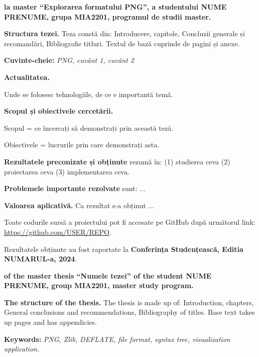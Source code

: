 \documentclass[a4paper,12pt]{report}
\newcommand{\thesisTitleEng}{Numele tezei}
\newcommand{\uniGroupName}{MIA2201}
\newcommand{\authorName}{NUME PRENUME} %
\newcommand{\thesisTitle}{Explorarea formatului PNG}
\newcommand{\thesisType}{master} %
\newcommand{\programulDeStudii}{master} %
\renewcommand{\year}{2024}
\newcommand{\conferencesList}{Conferința Studențească, Editia NUMARUL-a, \year}
\newcommand{\github}{\url{https://github.com/USER/REPO}}
\begin{document}
\titlePage

\clearpage
\tableofcontents

\clearpage
{}

\textbf{la \thesisType{} ``\thesisTitle{}'', a studentului \authorName{}, grupa \uniGroupName{}, programul de studii \programulDeStudii.}

\textbf{Structura tezei.}
Teza constă din: Introducere, \chapterCount{} capitole, Concluzii generale și recomandări, Bibliografie \bibliographyEntryCount{} titluri.
Textul de bază cuprinde \usefulPageCount{} de pagini și \anexeCount{} anexe.

\textbf{Cuvinte-cheie:}
\textit{\acs{PNG}, cuvânt 1, cuvânt 2}

\textbf{Actualitatea.}

Unde se folosesc tehnologiile, de ce e importantă temă.

\textbf{Scopul și obiectivele cercetării.}

Scopul = ce încercați să demonstrați prin această teză.

Obiectivele = lucrurile prin care demonstrați asta.

\textbf{Rezultatele preconizate și obținute} rezumă în: 
(1) studierea ceva
(2) proiectarea ceva
(3) implementarea ceva.

\textbf{Problemele importante rezolvate} sunt: ...

\textbf{Valoarea aplicativă.} Ca rezultat s-a obținut ...

Toate codurile sursă a proiectului pot fi accesate pe GitHub după următorul link: \github.

Rezultatele obținute au fost raportate la \textbf{\conferencesList}\cite{self}.

\clearpage
{}

\textbf{of the \thesisType{} thesis  ``\thesisTitleEng'' of the student \authorName{}, group \uniGroupName{}, \programulDeStudii{} study program.}

\textbf{The structure of the thesis.}
The thesis is made up of: Introduction, \chapterCount{} chapters,
General conclusions and recommendations, Bibliography of \bibliographyEntryCount{} titles.
Base text takes up \usefulPageCount{} pages and has \anexeCount{} appendicies.

\textbf{Keywords:}
\textit{\acs{PNG}, Zlib, DEFLATE, file format, syntax tree, visualization application.}
\end{document}
